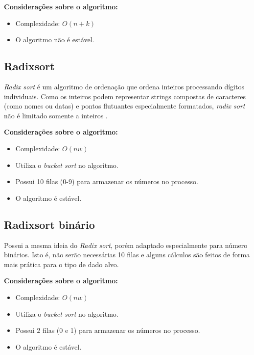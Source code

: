 \documentclass[
	11pt,
	oneside,
	a4paper,
	english,
	brazil,
	]{article}
\begin{document}
\noindent \textbf{Considerações sobre o algoritmo:}
\begin{itemize}
 \item Complexidade: $ O(n + k) $
 \item O algoritmo não é estável.
\end{itemize}

\subsection{Radixsort}
\textit{Radix sort} é um algoritmo de ordenação que ordena inteiros processando 
dígitos individuais. Como os inteiros podem representar strings compostas de 
caracteres (como nomes ou datas) e pontos flutuantes especialmente formatados, 
\textit{radix sort} não é limitado somente a inteiros \cite{radix}.

\noindent \textbf{Considerações sobre o algoritmo:}
\begin{itemize}
 \item Complexidade: $ O(nw) $
 \item Utiliza o \textit{bucket sort} no algoritmo.
 \item Possui 10 filas (0-9) para armazenar os números no processo.
 \item O algoritmo é estável.
\end{itemize}

\subsection{Radixsort binário}
Possui a mesma ideia do \textit{Radix sort}, porém adaptado especialmente
para número binários. Isto é, não serão necessárias 10 filas e alguns
cálculos são feitos de forma mais prática para o tipo de dado alvo.

\noindent \textbf{Considerações sobre o algoritmo:}
\begin{itemize}
 \item Complexidade: $ O(nw) $
 \item Utiliza o \textit{bucket sort} no algoritmo.
 \item Possui 2 filas (0 e 1) para armazenar os números no processo.
 \item O algoritmo é estável.
\end{itemize}

\end{document}
